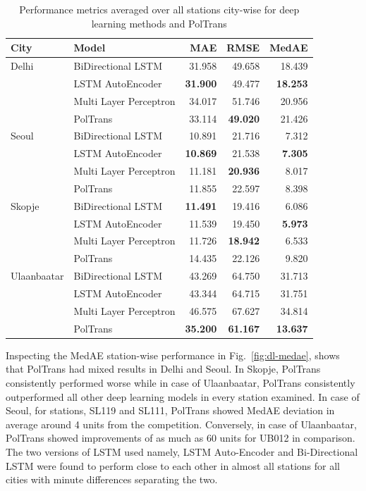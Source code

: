 \documentclass[10pt,journal]{IEEEtran}
\begin{document}
\begin{table}[h]
\small
\centering
\tabcolsep=0.16cm
\caption{Performance metrics averaged over all stations city-wise for deep learning methods and PolTrans}
\label{tbl:dl-performance}
\begin{tabular}{llrrr}
\toprule
City & Model &   MAE &    RMSE &   MedAE \\
\midrule
Delhi & BiDirectional LSTM &  31.958 &  49.658 &  18.439 \\
            & LSTM AutoEncoder &  \textbf{31.900} &  49.477 &  \textbf{18.253} \\
            & Multi Layer Perceptron &  34.017 &  51.746 &  20.956 \\
            & PolTrans &  33.114 &  \textbf{49.020} &  21.426 \\
Seoul & BiDirectional LSTM &  10.891 &  21.716 &   7.312 \\
            & LSTM AutoEncoder &  \textbf{10.869} &  21.538 &   \textbf{7.305} \\
            & Multi Layer Perceptron &  11.181 &  \textbf{20.936} &   8.017 \\
            & PolTrans &  11.855 &  22.597 &   8.398 \\
Skopje & BiDirectional LSTM &  \textbf{11.491} &  19.416 &   6.086 \\
            & LSTM AutoEncoder &  11.539 &  19.450 &   \textbf{5.973} \\
            & Multi Layer Perceptron &  11.726 &  \textbf{18.942} &   6.533 \\
            & PolTrans &  14.435 &  22.126 &   9.820 \\
Ulaanbaatar & BiDirectional LSTM &  43.269 &  64.750 &  31.713 \\
            & LSTM AutoEncoder &  43.344 &  64.715 &  31.751 \\
            & Multi Layer Perceptron &  46.575 &  67.627 &  34.814 \\
            & PolTrans &  \textbf{35.200} & \textbf{61.167} &  \textbf{13.637} \\
\bottomrule
\end{tabular}
\end{table}

Inspecting the MedAE station-wise performance in Fig.~\ref{fig:dl-medae}, shows that  {PolTrans}  had mixed results in Delhi and Seoul. In Skopje, {PolTrans}  consistently performed worse while in case of Ulaanbaatar, {PolTrans}  consistently outperformed all other deep learning models in every station examined. In case of Seoul, for stations, SL119 and SL111, {PolTrans}  showed MedAE deviation in average around 4 units from the competition. Conversely, in case of Ulaanbaatar,  {PolTrans}  showed improvements of as much as 60 units for UB012 in comparison. The two versions of LSTM used namely, LSTM Auto-Encoder and Bi-Directional LSTM were found to perform close to each other in almost all stations for all cities with minute differences separating the two. 
\end{document}
